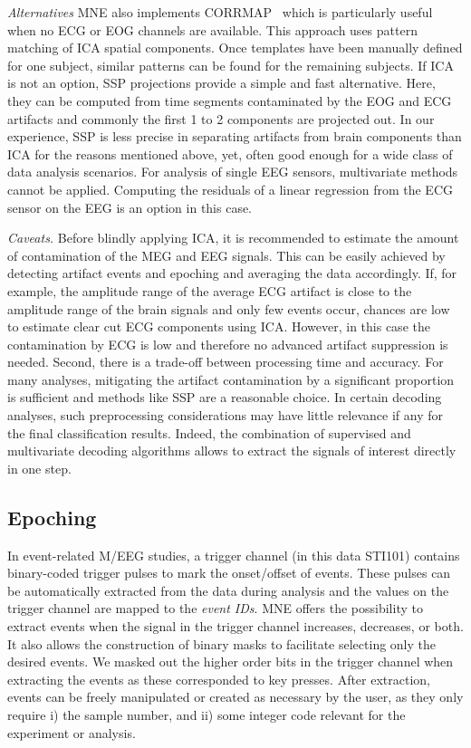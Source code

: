 \emph{Alternatives} MNE also implements CORRMAP~\citep{viola2009semi} which is particularly useful when no ECG or EOG channels are available. This approach uses pattern matching of ICA spatial components. Once templates have been manually defined for one subject, similar patterns can be found for the remaining subjects. If ICA is not an option, SSP projections provide a simple and fast alternative. Here, they can be computed from time segments contaminated by the EOG and ECG artifacts and commonly the first 1 to 2 components are projected out. In our experience, SSP is less precise in separating artifacts from brain components than ICA for the reasons mentioned above, yet, often good enough for a wide class of data analysis scenarios. For analysis of single EEG sensors, multivariate methods cannot be applied. Computing the residuals of a linear regression from the ECG sensor on the EEG is an option in this case.

\emph{Caveats.} Before blindly applying ICA, it is recommended to estimate the amount of contamination of the MEG and EEG signals. This can be easily achieved by detecting artifact events and epoching and averaging the data accordingly. If, for example, the amplitude range of the average ECG artifact is close to the amplitude range of the brain signals and only few events occur, chances are low to estimate clear cut ECG components using ICA. However, in this case the contamination by ECG is low and therefore no advanced artifact suppression is needed. Second, there is a trade-off between processing time and accuracy. For many analyses, mitigating the artifact contamination by a significant proportion is sufficient and methods like SSP are a reasonable choice. In certain decoding analyses, such preprocessing considerations may have little relevance if any for the final classification results. Indeed, the combination of supervised and multivariate decoding algorithms allows to extract the signals of interest directly in one step.

\subsection{Epoching}
\label{sec:epoching}
In event-related M/EEG studies, a trigger channel (in this data STI101) contains binary-coded trigger pulses to mark the onset/offset of events. These pulses can be automatically extracted from the data during analysis and the values on the trigger channel are mapped to the \textit{event IDs}. MNE offers the possibility to extract events when the signal in the trigger channel increases, decreases, or both. It also allows the construction of binary masks to facilitate selecting only the desired events. We masked out the higher order bits in the trigger channel when extracting the events as these corresponded to key presses. After extraction, events can be freely manipulated or created as necessary by the user, as they only require i) the sample number, and ii) some integer code relevant for the experiment or analysis.

